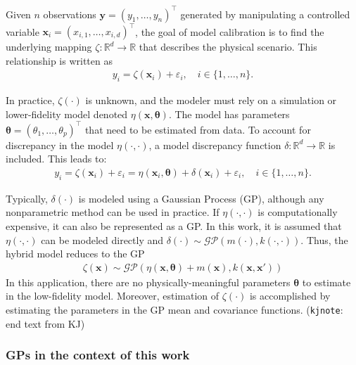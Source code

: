 \documentclass[journal=jacsat,manuscript=article]{achemso}
\newcommand{\kjnote}[1]{{\color{Blue} (\texttt{kjnote}: #1)}}
\newcommand{\xvec}{\ensuremath{\mathbf{x}}}
\begin{document}
 Given $n$ observations $\mathbf{y}=(y_1,\dots,y_n)^\intercal$ generated by manipulating a controlled variable $\xvec_i = (x_{i,1},\dots,x_{i,d})^\intercal$, the goal of model calibration is to find the underlying mapping $\zeta: \mathbb{R}^d \rightarrow \mathbb{R}$ that describes the physical scenario. This relationship is written as
 \begin{gather}
     y_i = \zeta(\mathbf{x}_i) + \varepsilon_i, \quad i \in \{1,\dots,n\}. \label{eq: trueprocess}
 \end{gather}

 In practice, $\zeta(\cdot)$ is unknown, and the modeler must rely on a simulation or lower-fidelity model denoted $\eta(\mathbf{x}, \boldsymbol{\theta})$. The model has parameters $\boldsymbol{\theta}=(\theta_1,\dots,\theta_p)^\intercal$ that need to be estimated from data. To account for discrepancy in the model $\eta(\cdot,\cdot)$, a model discrepancy function $\delta: \mathbb{R}^d \rightarrow \mathbb{R}$ is included. This leads to:
 \begin{gather}
      y_i = \zeta(\mathbf{x}_i) + \varepsilon_i = \eta(\mathbf{x}_i,\boldsymbol{\theta}) + \delta(\mathbf{x}_i) + \varepsilon_i, \quad i \in \{1,\dots,n\}.
 \end{gather}

 Typically, $\delta(\cdot)$ is modeled using a Gaussian Process (GP), although any nonparametric method can be used in practice. If $\eta(\cdot,\cdot)$ is computationally expensive, it can also be represented as a GP. In this work, it is assumed that $\eta(\cdot,\cdot)$ can be modeled directly and $\delta(\cdot)\sim \mathcal{GP}(m(\cdot),k(\cdot,\cdot))$. Thus, the hybrid model reduces to the GP
 \begin{gather}
     \zeta(\mathbf{x}) \sim \mathcal{GP}(\eta(\mathbf{x},\boldsymbol{\theta}) + m(\mathbf{x}), k(\mathbf{x}, \mathbf{x}'))
 \end{gather}
In this application, there are no physically-meaningful parameters $\boldsymbol{\theta}$ to estimate in the low-fidelity model. Moreover, estimation of $\zeta(\cdot)$ is accomplished by estimating the parameters in the GP mean and covariance functions.
\kjnote{end text from KJ}





\subsubsection{GPs in the context of this work}
\end{document}
